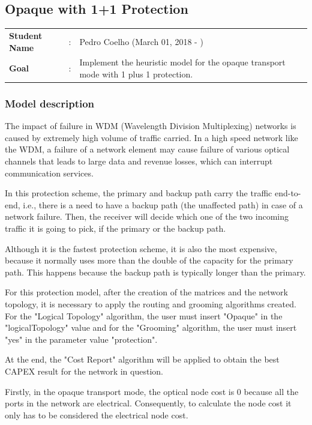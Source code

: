 \clearpage

\subsection{Opaque with 1+1 Protection}\label{heuristic_Opaque_Protection}
\begin{tcolorbox}	
\begin{tabular}{p{2.75cm} p{0.2cm} p{10.5cm}} 	
\textbf{Student Name}  &:& Pedro Coelho    (March 01, 2018 - )\\
\textbf{Goal}          &:& Implement the heuristic model for the opaque transport mode with 1 plus 1 protection.
\end{tabular}
\end{tcolorbox}

\subsubsection{Model description}

The impact of failure in WDM (Wavelength Division Multiplexing) networks is caused by extremely high volume of traffic carried. In a high speed network like the WDM, a failure of a network element may cause failure of various optical channels that leads to large data and revenue losses, which can interrupt communication services.

In this protection scheme, the primary and backup path carry the traffic end-to-end, i.e., there is a need to have a backup path (the unaffected path) in case of a network failure. Then, the receiver will decide which one of the two incoming traffic it is going to pick, if the primary or the backup path.

Although it is the fastest protection scheme, it is also the most expensive, because it normally uses more than the double of the capacity for the primary path. This happens because the backup path is typically longer than the primary.

For this protection model, after the creation of the matrices and the network topology, it is necessary to apply the routing and grooming algorithms created. For the "Logical Topology" algorithm, the user must insert "Opaque" in the "logicalTopology" value and for the "Grooming" algorithm, the user must insert "yes" in the parameter value "protection".

At the end, the "Cost Report" algorithm will be applied to obtain the best CAPEX result for the network in question.

Firstly, in the opaque transport mode, the optical node cost is 0 because all the ports in the network are electrical. Consequently, to calculate the node cost it only has to be considered the electrical node cost.

